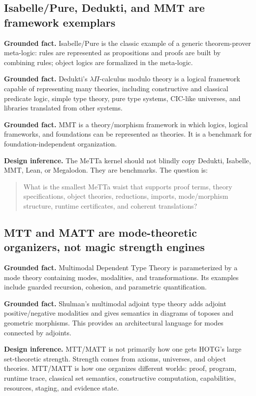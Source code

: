 \documentclass[11pt]{article}
\newcommand{\MeTTa}{\textup{MeTTa}}
\newcommand{\HOTG}{\textup{HOTG}}
\newcommand{\MTT}{\textup{MTT}}
\newcommand{\MATT}{\textup{MATT}}
\newcommand{\Fact}{\textbf{Grounded fact.}}
\newcommand{\Infer}{\textbf{Design inference.}}
\begin{document}
\subsection{Isabelle/Pure, Dedukti, and MMT are framework exemplars}

\Fact{} Isabelle/Pure is the classic example of a generic theorem-prover meta-logic: rules are represented as propositions and proofs are built by combining rules; object logics are formalized in the meta-logic.\cite{isabelle-pure}

\Fact{} Dedukti's \(\lambda\Pi\)-calculus modulo theory is a logical framework capable of representing many theories, including constructive and classical predicate logic, simple type theory, pure type systems, CIC-like universes, and libraries translated from other systems.\cite{dedukti}

\Fact{} MMT is a theory/morphism framework in which logics, logical frameworks, and foundations can be represented as theories.  It is a benchmark for foundation-independent organization.\cite{mmt}

\Infer{} The \MeTTa{} kernel should not blindly copy Dedukti, Isabelle, MMT, Lean, or Megalodon.  They are benchmarks.  The question is:
\begin{quote}
What is the smallest \MeTTa{} waist that supports proof terms, theory specifications, object theories, reductions, imports, mode/morphism structure, runtime certificates, and coherent translations?
\end{quote}

\subsection{MTT and MATT are mode-theoretic organizers, not magic strength engines}

\Fact{} Multimodal Dependent Type Theory is parameterized by a mode theory containing modes, modalities, and transformations.  Its examples include guarded recursion, cohesion, and parametric quantification.\cite{mtt}

\Fact{} Shulman's multimodal adjoint type theory adds adjoint positive/negative modalities and gives semantics in diagrams of toposes and geometric morphisms.  This provides an architectural language for modes connected by adjoints.\cite{matt}

\Infer{} \MTT{}/\MATT{} is not primarily how one gets \HOTG{}'s large set-theoretic strength.  Strength comes from axioms, universes, and object theories.  \MTT{}/\MATT{} is how one organizes different worlds: proof, program, runtime trace, classical set semantics, constructive computation, capabilities, resources, staging, and evidence state.
\end{document}
